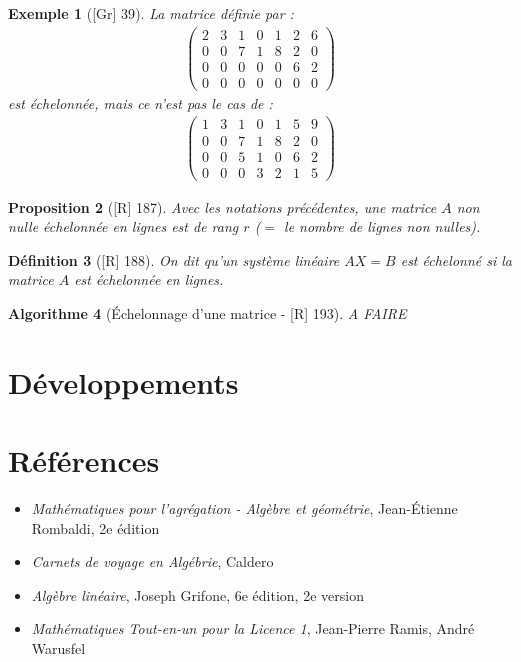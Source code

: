 \documentclass[10pt, a4paper, parskip=full, twoside, twocolumn]{report}
\newtheorem{definition}{Définition}
\newtheorem{proposition}[definition]{Proposition}
\newtheorem{example}[definition]{Exemple}
\newtheorem{algorithm}[definition]{Algorithme}
\begin{document}
\begin{example}[\textnormal{[Gr] 39}]
	La matrice définie par :
	\begin{align*}
		\begin{pmatrix}
			2&3&1&0&1&2&6 \\
			0&0&7&1&8&2&0 \\
			0&0&0&0&0&6&2 \\
			0&0&0&0&0&0&0
		\end{pmatrix}
	\end{align*}
	est échelonnée, mais ce n'est pas le cas de :
	\begin{align*}
		\begin{pmatrix}
			1&3&1&0&1&5&9 \\
			0&0&7&1&8&2&0 \\
			0&0&5&1&0&6&2 \\
			0&0&0&3&2&1&5
		\end{pmatrix}
	\end{align*}
\end{example}

\begin{proposition}[\textnormal{[R] 187}]
	Avec les notations précédentes, une matrice $A$ non nulle échelonnée en lignes est de rang $r$ ($=$ le nombre de lignes non nulles).
\end{proposition}

\begin{definition}[\textnormal{[R] 188}]
	On dit qu'un système linéaire $AX = B$ est \emph{échelonné} si la matrice $A$ est échelonnée en lignes.
\end{definition}

\begin{algorithm}[Échelonnage d'une matrice - \textnormal{[R] 193}]
	A FAIRE
\end{algorithm}


\section*{Développements}

\section*{Références}
\begin{itemize}
	\item[R] \emph{Mathématiques pour l'agrégation - Algèbre et géométrie}, Jean-Étienne Rombaldi, 2e édition
	\item[C] \emph{Carnets de voyage en Algébrie}, Caldero
	\item[Gr] \emph{Algèbre linéaire}, Joseph Grifone, 6e édition, 2e version
	\item[TL1] \emph{Mathématiques Tout-en-un pour la Licence 1}, Jean-Pierre Ramis, André Warusfel
\end{itemize}

\end{document}
